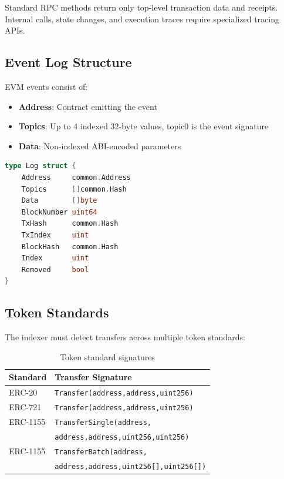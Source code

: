 \documentclass[11pt,twocolumn]{article}
\begin{document}
Standard RPC methods return only top-level transaction data and receipts. Internal calls, state changes, and execution traces require specialized tracing APIs.

\subsection{Event Log Structure}

EVM events consist of:

\begin{itemize}
\item \textbf{Address}: Contract emitting the event
\item \textbf{Topics}: Up to 4 indexed 32-byte values, topic0 is the event signature
\item \textbf{Data}: Non-indexed ABI-encoded parameters
\end{itemize}

\begin{lstlisting}[language=Go,caption={Event log structure}]
type Log struct {
    Address     common.Address
    Topics      []common.Hash
    Data        []byte
    BlockNumber uint64
    TxHash      common.Hash
    TxIndex     uint
    BlockHash   common.Hash
    Index       uint
    Removed     bool
}
\end{lstlisting}

\subsection{Token Standards}

The indexer must detect transfers across multiple token standards:

\begin{table}[h]
\centering
\caption{Token standard signatures}
\begin{tabular}{@{}ll@{}}
\toprule
Standard & Transfer Signature \\
\midrule
ERC-20 & \texttt{Transfer(address,address,uint256)} \\
ERC-721 & \texttt{Transfer(address,address,uint256)} \\
ERC-1155 & \texttt{TransferSingle(address,} \\
& \quad\texttt{address,address,uint256,uint256)} \\
ERC-1155 & \texttt{TransferBatch(address,} \\
& \quad\texttt{address,address,uint256[],uint256[])} \\
\bottomrule
\end{tabular}
\label{tab:token-signatures}
\end{table}
\end{document}
